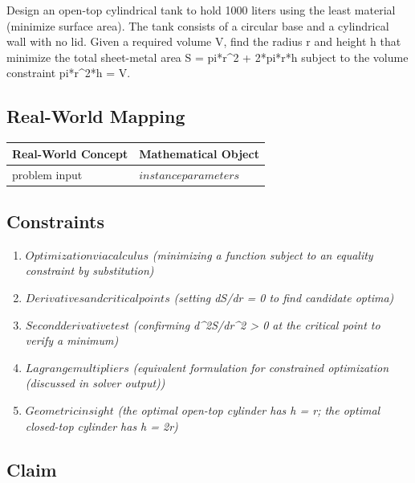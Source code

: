 \documentclass[11pt, a4paper]{article}
\begin{document}
Design an open-top cylindrical tank to hold 1000 liters using the least material (minimize surface area). The tank consists of a circular base and a cylindrical wall with no lid. Given a required volume V, find the radius r and height h that minimize the total sheet-metal area S = pi*r\textasciicircum{}2 + 2*pi*r*h subject to the volume constraint pi*r\textasciicircum{}2*h = V.

\subsection{Real-World Mapping}

\begin{longtable}{ll}
\toprule
\textbf{Real-World Concept} & \textbf{Mathematical Object} \\
\midrule
\endhead
problem input & $instance parameters$ \\
\bottomrule
\end{longtable}

\subsection{Constraints}

\begin{enumerate}
  \item $Optimization via calculus$
  \hfill \textit{(minimizing a function subject to an equality constraint by substitution)}
  \item $Derivatives and critical points$
  \hfill \textit{(setting dS/dr = 0 to find candidate optima)}
  \item $Second derivative test$
  \hfill \textit{(confirming d\textasciicircum{}2S/dr\textasciicircum{}2 > 0 at the critical point to verify a minimum)}
  \item $Lagrange multipliers$
  \hfill \textit{(equivalent formulation for constrained optimization (discussed in solver output))}
  \item $Geometric insight$
  \hfill \textit{(the optimal open-top cylinder has h = r; the optimal closed-top cylinder has h = 2r)}
\end{enumerate}

\subsection{Claim}
\end{document}
